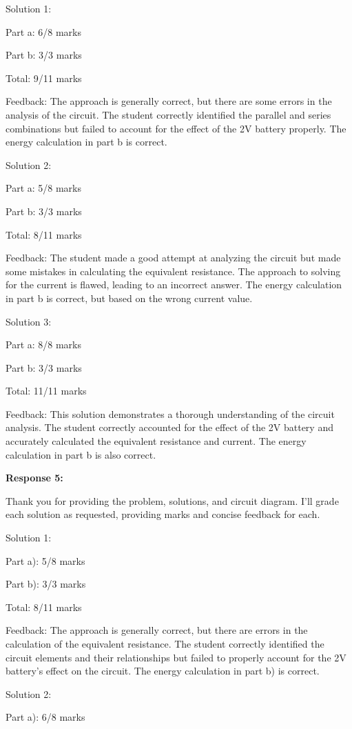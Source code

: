 \documentclass[a4paper,11pt]{article}
\begin{document}
Solution 1:

Part a: 6/8 marks

Part b: 3/3 marks

Total: 9/11 marks

Feedback: The approach is generally correct, but there are some errors in the analysis of the circuit. The student correctly identified the parallel and series combinations but failed to account for the effect of the 2V battery properly. The energy calculation in part b is correct.

Solution 2:

Part a: 5/8 marks

Part b: 3/3 marks

Total: 8/11 marks

Feedback: The student made a good attempt at analyzing the circuit but made some mistakes in calculating the equivalent resistance. The approach to solving for the current is flawed, leading to an incorrect answer. The energy calculation in part b is correct, but based on the wrong current value.

Solution 3:

Part a: 8/8 marks

Part b: 3/3 marks

Total: 11/11 marks

Feedback: This solution demonstrates a thorough understanding of the circuit analysis. The student correctly accounted for the effect of the 2V battery and accurately calculated the equivalent resistance and current. The energy calculation in part b is also correct.

\bigskip
\textbf{Response 5:}

Thank you for providing the problem, solutions, and circuit diagram. I'll grade each solution as requested, providing marks and concise feedback for each.

Solution 1:

Part a): 5/8 marks

Part b): 3/3 marks

Total: 8/11 marks

Feedback: The approach is generally correct, but there are errors in the calculation of the equivalent resistance. The student correctly identified the circuit elements and their relationships but failed to properly account for the 2V battery's effect on the circuit. The energy calculation in part b) is correct.

Solution 2:

Part a): 6/8 marks
\end{document}
